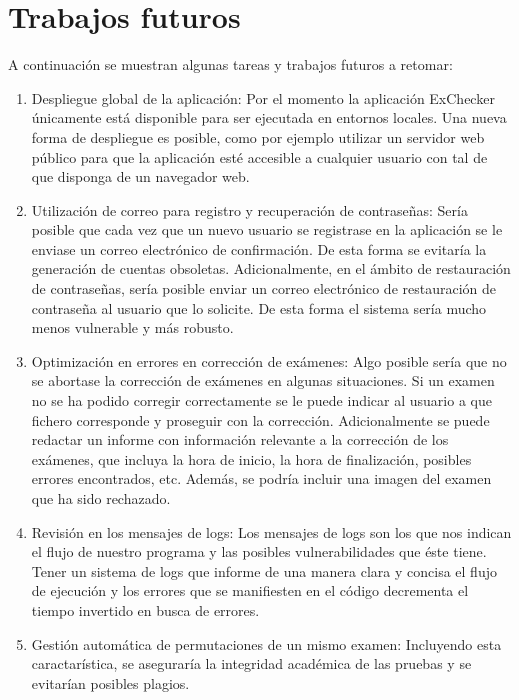 \documentclass[a4paper, 12pt]{book}
\begin{document}
\section{Trabajos futuros}
\label{sec:trabajos_futuros}

A continuación se muestran
algunas tareas y trabajos futuros
a retomar:

\begin{enumerate}
  \item Despliegue global de la aplicación: Por el momento la aplicación
  ExChecker únicamente está disponible para ser ejecutada en entornos locales.
  Una nueva forma de despliegue es posible, como por ejemplo utilizar
  un servidor web público para que la aplicación esté accesible a cualquier
  usuario con tal de que disponga de un navegador web.
  \item Utilización de correo para registro y recuperación de contraseñas:
  Sería posible que cada vez que un nuevo usuario se registrase en la aplicación
  se le enviase un correo electrónico de confirmación. De esta forma se evitaría
  la generación de cuentas obsoletas. Adicionalmente, en el ámbito de
  restauración de contraseñas, sería posible enviar un correo electrónico
  de restauración de contraseña al usuario que lo solicite. De esta forma
  el sistema sería mucho menos vulnerable y más robusto.
  \item Optimización en errores en corrección de exámenes: Algo posible
  sería que no se abortase la corrección de exámenes en algunas situaciones.
  Si un examen no se ha podido corregir correctamente se le puede indicar
  al usuario a que fichero corresponde y proseguir con la corrección. Adicionalmente
  se puede redactar un informe con información relevante a la corrección
  de los exámenes, que incluya la hora de inicio, la hora de finalización,
  posibles errores encontrados, etc. Además, se podría incluir una imagen del examen
  que ha sido rechazado.
  \item Revisión en los mensajes de logs: Los mensajes de logs son los que
  nos indican el flujo de nuestro programa y las posibles vulnerabilidades
  que éste tiene. Tener un sistema de logs que informe de una manera clara
  y concisa el flujo de ejecución y los errores que se manifiesten en el código
  decrementa
  el tiempo invertido en busca de errores.
  \item Gestión automática de permutaciones de un mismo examen: Incluyendo
  esta caractarística, se aseguraría la integridad académica de las
  pruebas y se evitarían posibles plagios.

\end{enumerate}
\end{document}
